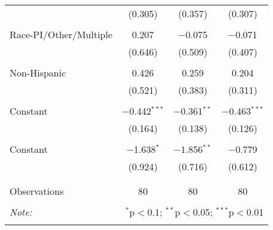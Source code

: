 \documentclass{article}
\begin{document}
\begin{table}[!htbp]
\begin{tabular}{@{\extracolsep{5pt}}lccc}
  & (0.305) & (0.357) & (0.307) \\ 
  & & & \\ 
 Race-PI/Other/Multiple & 0.207 & $-$0.075 & $-$0.071 \\ 
  & (0.646) & (0.509) & (0.407) \\ 
  & & & \\ 
 Non-Hispanic & 0.426 & 0.259 & 0.204 \\ 
  & (0.521) & (0.383) & (0.311) \\ 
  & & & \\ 
 Constant & $-$0.442$^{***}$ & $-$0.361$^{**}$ & $-$0.463$^{***}$ \\ 
  & (0.164) & (0.138) & (0.126) \\ 
  & & & \\ 
 Constant & $-$1.638$^{*}$ & $-$1.856$^{**}$ & $-$0.779 \\ 
  & (0.924) & (0.716) & (0.612) \\ 
  & & & \\ 
\hline \\[-1.8ex] 
Observations & 80 & 80 & 80 \\ 
\hline 
\hline \\[-1.8ex] 
\textit{Note:}  & \multicolumn{3}{r}{$^{*}$p$<$0.1; $^{**}$p$<$0.05; $^{***}$p$<$0.01} \\ 
\normalsize 
\end{tabular} 
\end{table} 
\end{document}

